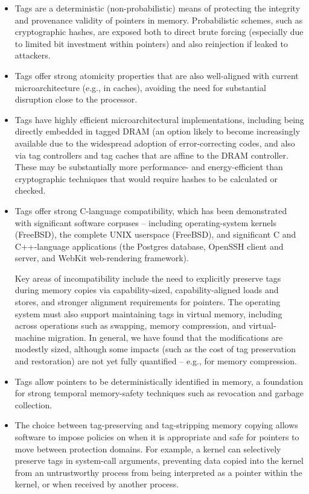 \begin{itemize}
\item Tags are a deterministic (non-probabilistic) means of protecting the
  integrity and provenance validity of pointers in memory.
  Probabilistic schemes, such as cryptographic hashes, are exposed both to
  direct brute forcing (especially due to limited bit investment within
  pointers) and also reinjection if leaked to attackers.

\item Tags offer strong atomicity properties that are also well-aligned with
  current microarchitecture (e.g., in caches), avoiding the need for
  substantial disruption close to the processor.

\item Tags have highly efficient microarchitectural implementations, including
  being directly embedded in tagged DRAM (an option likely to become increasingly
  available due to the widespread adoption of
error-correcting codes, and also via tag
  controllers and tag caches that are affine to the DRAM controller.
  These may be substantially more performance- and energy-efficient than
  cryptographic techniques that would require hashes to be calculated or checked.

\item Tags offer strong C-language compatibility, which has been demonstrated
  with significant software corpuses -- including operating-system kernels
  (FreeBSD), the complete UNIX userspace (FreeBSD), and significant C and
  C++-language applications (the Postgres database, OpenSSH client and server,
  and WebKit web-rendering framework).

  Key areas of incompatibility include the need to explicitly preserve tags
  during memory copies via capability-sized, capability-aligned loads and
  stores, and stronger alignment requirements for pointers.
  The operating system must also support maintaining tags in virtual memory,
  including across operations such as swapping, memory compression, and
  virtual-machine migration.
  In general, we have found that the modifications are modestly sized,
  although some impacts (such as the cost of tag preservation and
  restoration) are not yet fully quantified -- e.g., for memory compression.

\item Tags allow pointers to be deterministically identified in memory, a
  foundation for strong temporal memory-safety techniques such as revocation
  and garbage collection.

\item The choice between tag-preserving and tag-stripping memory copying
  allows software to impose policies on when it is appropriate and safe for
  pointers to move between protection domains.
  For example, a kernel can selectively preserve tags in system-call
  arguments,
  preventing data copied into the kernel from an untrustworthy process from
  being interpreted as a pointer within the kernel, or when received by
  another process.
\end{itemize}


